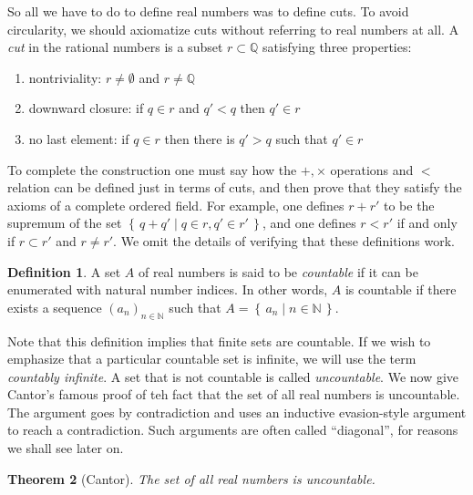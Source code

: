 \documentclass[11pt,oneside]{amsart}
\newcommand{\set}[1]{\left\{\,#1\,\right\}}
\newcommand{\NN}{\mathbb N}
\newcommand{\QQ}{\mathbb Q}
\newtheorem{thm}{Theorem}[section]
\theoremstyle{definition}
\newtheorem{defn}[thm]{Definition}
\theoremstyle{remark}
\begin{document}
So all we have to do to define real numbers was to define cuts. To avoid circularity, we should axiomatize cuts without referring to real numbers at all. A \emph{cut} in the rational numbers is a subset $r\subset\QQ$ satisfying three properties:
\begin{enumerate}
\item nontriviality: $r\neq\emptyset$ and $r\neq\QQ$
\item downward closure: if $q\in r$ and $q'<q$ then $q'\in r$
\item no last element: if $q\in r$ then there is $q'>q$ such that $q'\in r$
\end{enumerate}
To complete the construction one must say how the $+,\times$ operations and $<$ relation can be defined just in terms of cuts, and then prove that they satisfy the axioms of a complete ordered field. For example, one defines $r+r'$ to be the supremum of the set $\set{q+q'\mid q\in r,q'\in r'}$, and one defines $r<r'$ if and only if $r\subset r'$ and $r\neq r'$. We omit the details of verifying that these definitions work.

\begin{defn}
  A set $A$ of real numbers is said to be \emph{countable} if it can be enumerated with natural number indices. In other words, $A$ is countable if there exists a sequence $(a_n)_{n\in\NN}$ such that $A=\set{a_n\mid n\in\NN}$.
\end{defn}

Note that this definition implies that finite sets are countable. If we wish to emphasize that a particular countable set is infinite, we will use the term \emph{countably infinite}. A set that is not countable is called \emph{uncountable}. We now give Cantor's famous proof of teh fact that the set of all real numbers is uncountable. The argument goes by contradiction and uses an inductive evasion-style argument to reach a contradiction. Such arguments are often called ``diagonal'', for reasons we shall see later on.

\begin{thm}[Cantor]
  The set of all real numbers is uncountable.
\end{thm}
\end{document}
